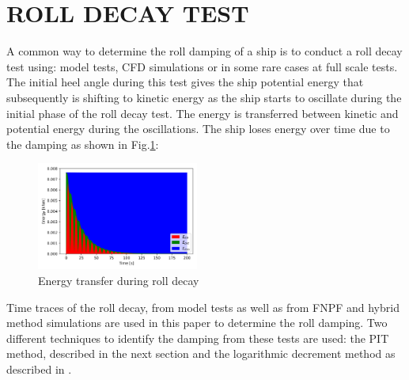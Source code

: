 \section*{ROLL DECAY TEST}\label{roll-decay-test}
A common way to determine the roll damping of a ship is to conduct a
roll decay test using: model tests, CFD simulations or in some rare
cases at full scale tests. The initial heel angle during this test gives
the ship potential energy that subsequently is shifting to kinetic
energy as the ship starts to oscillate during the initial phase of the
roll decay test. The energy is transferred between kinetic and potential
energy during the oscillations. The ship loses energy over time due to
the damping as shown in Fig.\ref{fig:energy}:
\begin{figure}[H]
\begin{center}\includegraphics[width = 0.475\textwidth]{figures/energy.png}\end{center}
\vspace{-0.7cm}
\caption{Energy transfer during roll decay}
\label{fig:energy}
\end{figure}
Time traces of the roll decay, from model tests as well as from FNPF and
hybrid method simulations are used in this paper to determine the roll
damping. Two different techniques to identify the damping from these
tests are used: the PIT method, described in the next section and the
logarithmic decrement method as described in \citep{7505983/BYNJ8CFG}.
